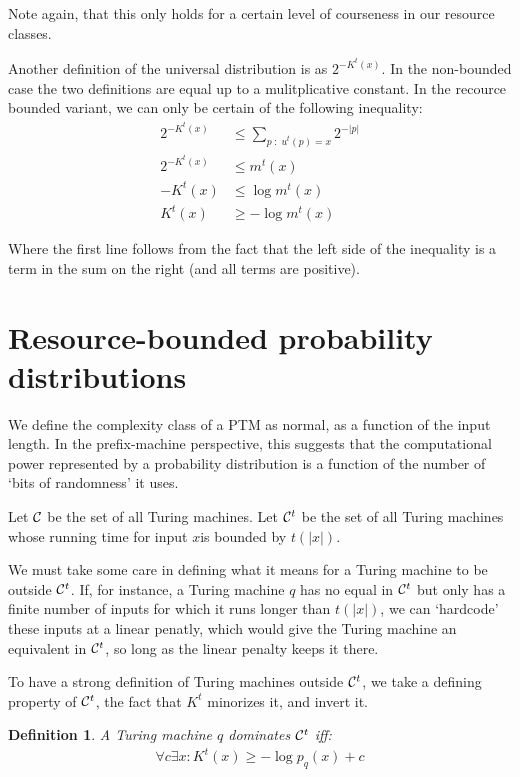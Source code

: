 \documentclass[10pt,a4paper,oneside]{article}
\newtheorem{dfn}{Definition}
\begin{document}
Note again, that this only holds for a certain level of courseness in our resource classes.


Another definition of the universal distribution is as $2^{-K^t(x)}$. In the non-bounded case the two definitions are equal up to a mulitplicative constant. In the recource bounded variant, we can only be certain of the following inequality:
\begin{align*}
2^{-K^t(x)} &\leq \sum_{p\;:\;u^t(p) = x} 2^{-|p|}  \\
2^{-K^t(x)} &\leq m^t(x) \\
-K^t(x) &\leq \log m^t(x) \\ 
K^t(x) &\geq -\log m^t(x)
\end{align*}

Where the first line follows from the fact that the left side of the inequality is a term in the sum on the right (and all terms are positive). 

\section*{Resource-bounded probability distributions}

We define the complexity class of a PTM as normal, as a function of the input length. In the prefix-machine perspective, this suggests that the computational power represented by a probability distribution is a function of the number of `bits of randomness' it uses.

Let $\cal C$ be the set of all Turing machines. Let ${\cal C}^t$ be the set of all Turing machines whose running time for input $x$is bounded by $t(|x|)$.

We must take some care in defining what it means for a Turing machine to be outside ${\cal C}^t$. If, for instance, a Turing machine $q$ has no equal in ${\cal C}^t$ but only has a finite number of inputs for which it runs longer than $t(|x|)$, we can `hardcode' these inputs at a linear penatly, which would give the Turing machine an equivalent in ${\cal C}^t$, so long as the linear penalty keeps it there. 

To have a strong definition of Turing machines outside ${\cal C}^t$, we take a defining property of ${\cal C}^t$, the fact that $K^t$ minorizes it, and invert it.
 
\begin{dfn}
A Turing machine $q$ dominates ${\cal C}^t$ iff:
\begin{align*}
\forall c \exists x : K^t(x) \geq -\log p_q(x) + c
\end{align*}
\label{dfn:domination}
\end{dfn}
\end{document}
